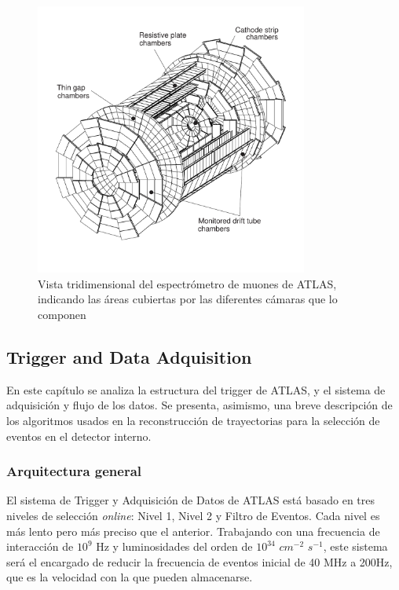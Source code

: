 \begin{figure}[htbp]
  \begin{center}
      \includegraphics[width=0.8\textwidth]{Fig2/muonspectrometeradele-bw.pdf}
    \caption{Vista tridimensional del espectr\'ometro de muones de ATLAS, indicando las \'areas cubiertas por las diferentes c\'amaras que lo componen}
    \label{fig:MUON1}
  \end{center}
\end{figure}



\subsection{Trigger and Data Adquisition}\label{sec:atlasCALO}
 En este cap\'itulo se analiza la estructura del trigger de ATLAS, y el sistema de adquisici\'on y flujo de los datos. Se presenta, asimismo, una breve descripci\'on de los algoritmos usados en la reconstrucci\'on de trayectorias para la selecci\'on de eventos en el detector interno. 


\subsubsection{Arquitectura general}

   El sistema de Trigger y Adquisici\'on de Datos\cite{TDRtdaq} de ATLAS est\'a basado en tres niveles de selecci\'on \emph{online}: Nivel 1, Nivel 2 y Filtro de Eventos. Cada nivel es m\'as lento pero m\'as preciso que el anterior. Trabajando con una frecuencia de interacci\'on de $10^{9}$ Hz y luminosidades del orden de $10^{34}$ $cm^{-2}$ $s^{-1}$, este sistema ser\'a el encargado de reducir la frecuencia de eventos inicial de 40 MHz a 200Hz, que es la velocidad con la que pueden almacenarse. 


